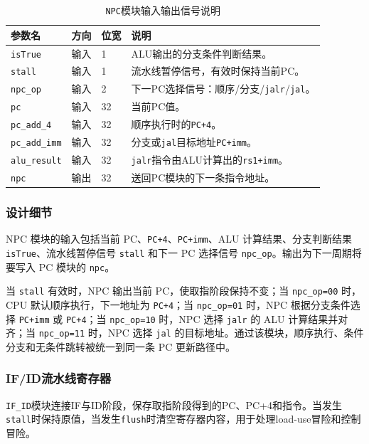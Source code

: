 \documentclass[12pt,a4paper]{ctexart}
\newcommand{\code}[1]{\texttt{#1}}
\begin{document}
\begin{table}[H]
\centering
\caption{\code{NPC}模块输入输出信号说明}
\footnotesize
\renewcommand{\arraystretch}{1.15}
\begin{tabularx}{\textwidth}{p{3.2cm}p{1.5cm}p{2.1cm}X}
\toprule
参数名 & 方向 & 位宽 & 说明 \\
\midrule
\code{isTrue} & 输入 & 1 & ALU输出的分支条件判断结果。 \\
\code{stall} & 输入 & 1 & 流水线暂停信号，有效时保持当前PC。 \\
\code{npc\_op} & 输入 & 2 & 下一PC选择信号：顺序/分支/\code{jalr}/\code{jal}。 \\
\code{pc} & 输入 & 32 & 当前PC值。 \\
\code{pc\_add\_4} & 输入 & 32 & 顺序执行时的\code{PC+4}。 \\
\code{pc\_add\_imm} & 输入 & 32 & 分支或\code{jal}目标地址\code{PC+imm}。 \\
\code{alu\_result} & 输入 & 32& \code{jalr}指令由ALU计算出的\code{rs1+imm}。 \\
\code{npc} & 输出 & 32 & 送回PC模块的下一条指令地址。 \\
\bottomrule
\end{tabularx}
\end{table}

\subsubsection*{设计细节}

NPC 模块的输入包括当前 PC、\code{PC+4}、\code{PC+imm}、ALU 计算结果、分支判断结果 \code{isTrue}、流水线暂停信号 \code{stall} 和下一 PC 选择信号 \code{npc\_op}。输出为下一周期将要写入 PC 模块的 \code{npc}。

当 \code{stall} 有效时，NPC 输出当前 PC，使取指阶段保持不变；当 \code{npc\_op=00} 时，CPU 默认顺序执行，下一地址为 \code{PC+4}；当 \code{npc\_op=01} 时，NPC 根据分支条件选择 \code{PC+imm} 或 \code{PC+4}；当 \code{npc\_op=10} 时，NPC 选择 \code{jalr} 的 ALU 计算结果并对齐；当 \code{npc\_op=11} 时，NPC 选择 \code{jal} 的目标地址。通过该模块，顺序执行、条件分支和无条件跳转被统一到同一条 PC 更新路径中。

\subsubsection{IF/ID流水线寄存器}

\code{IF\_ID}模块连接IF与ID阶段，保存取指阶段得到的PC、PC+4和指令。当发生\code{stall}时保持原值，当发生\code{flush}时清空寄存器内容，用于处理load-use冒险和控制冒险。
\end{document}
